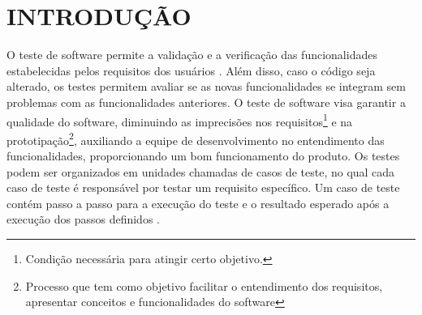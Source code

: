 \chapter{INTRODUÇÃO}
\label{chap:introducao}




O teste de software permite a validação e a verificação das funcionalidades estabelecidas pelos requisitos dos usuários \cite{PRESMA2016}. Além disso, caso o código seja alterado, os testes permitem avaliar se as novas funcionalidades se integram sem problemas com as funcionalidades anteriores. O teste de software visa garantir a qualidade do software, diminuindo as imprecisões nos requisitos\footnote{Condição necessária para atingir certo objetivo.} e na prototipação\footnote{ Processo que tem como objetivo facilitar o entendimento dos requisitos, apresentar conceitos e funcionalidades do software}, auxiliando a equipe de desenvolvimento no entendimento das funcionalidades, proporcionando um bom funcionamento do produto. Os testes podem ser organizados em unidades chamadas de casos de teste, no qual cada caso de teste é responsável por testar um requisito específico. Um caso de teste contém passo a passo para a execução do teste e o resultado esperado após a execução dos passos definidos \cite{Hushalini}.

